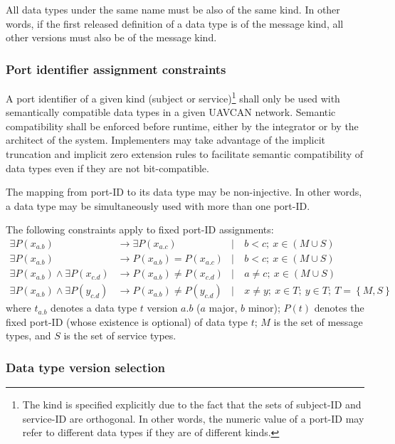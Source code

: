 All data types under the same name must be also of the same kind.
In other words, if the first released definition of a data type is of the message kind,
all other versions must also be of the message kind.

\subsubsection{Port identifier assignment constraints}

A port identifier of a given kind (subject or service)\footnote{%
    The kind is specified explicitly due to the fact that the sets of subject-ID and service-ID are orthogonal.
    In other words, the numeric value of a port-ID may refer to different data types if they are of different kinds.
} shall only be used with semantically compatible data types in a given UAVCAN network.
Semantic compatibility shall be enforced before runtime, either by the integrator or by the architect of the system.
Implementers may take advantage of the implicit truncation and implicit zero extension rules to facilitate
semantic compatibility of data types even if they are not bit-compatible.

The mapping from port-ID to its data type may be non-injective.
In other words, a data type may be simultaneously used with more than one port-ID.

The following constraints apply to fixed port-ID assignments:
\begin{align*}
    \exists P(x_{a.b})                          &\rightarrow \exists P(x_{a.c})
    &\mid&\ b < c;\ x \in (M \cup S)
    \\
    \exists P(x_{a.b})                          &\rightarrow         P(x_{a.b}) =    P(x_{a.c})
    &\mid&\ b < c;\ x \in (M \cup S)
    \\
    \exists P(x_{a.b}) \land \exists P(x_{c.d}) &\rightarrow         P(x_{a.b}) \neq P(x_{c.d})
    &\mid&\ a \neq c;\ x \in (M \cup S)
    \\
    \exists P(x_{a.b}) \land \exists P(y_{c.d}) &\rightarrow         P(x_{a.b}) \neq P(y_{c.d})
    &\mid&\ x \neq y;\ x \in T;\ y \in T;\ T = \left\{ M, S \right\}
\end{align*}
where $t_{a.b}$ denotes a data type $t$ version $a.b$ ($a$ major, $b$ minor);
$P(t)$ denotes the fixed port-ID (whose existence is optional) of data type $t$;
$M$ is the set of message types, and $S$ is the set of service types.

\subsubsection{Data type version selection}

